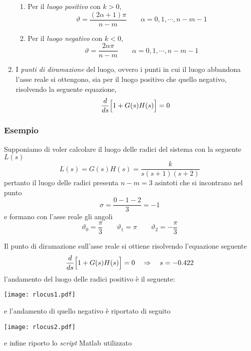 \begin{enumerate}
	\begin{enumerate}
		\item Per il \emph{luogo positivo} con $k>0$,
			\begin{equation}
				\vartheta = \frac{(2\alpha + 1) \pi}{n-m} \qquad \alpha = 0,1,\cdots,n-m-1
			\end{equation}
		\item Per il \emph{luogo negativo} con $k<0$,
			\begin{equation}
				\vartheta = \frac{2\alpha \pi}{n-m} \qquad \alpha = 0,1,\cdots,n-m-1
			\end{equation}
	\end{enumerate}
	\item I \emph{punti di diramazione} del luogo, ovvero i punti in cui il luogo abbandona l'asse reale si ottengono, sia per il luogo positivo che quello negativo, risolvendo la seguente equazione,
		\begin{equation}
			\frac{d}{ds} \Bigl[ 1 + G(s)H(s) \Bigr] = 0
		\end{equation}
\end{enumerate}

\subsubsection{Esempio}
Supponiamo di voler calcolare il luogo delle radici del sistema con la seguente $L(s)$
\begin{equation}
	L(s) = G(s)H(s) = \frac{k}{s(s+1)(s+2)} 
\end{equation}
pertanto il luogo delle radici presenta $n-m = 3$ asintoti che si incontrano nel punto
\begin{equation}
	\sigma = \frac{0-1-2}{3} = -1
\end{equation}
e formano con l'asse reale gli angoli
\begin{equation}
	\vartheta_0 = \frac{\pi}{3} \qquad \vartheta_1 = \pi \qquad \vartheta_2 = -\frac{\pi}{3} 
\end{equation}

Il punto di diramazione sull'asse reale si ottiene risolvendo l'equazione seguente
\begin{equation}
	\frac{d}{ds} \Bigl[ 1 + G(s)H(s) \Bigr] = 0 \quad \Rightarrow \quad s = -0.422
\end{equation}
l'andamento del luogo delle radici positivo è il seguente:
\begin{center}
	\texttt{[image: rlocus1.pdf]}
\end{center}
e l'andamento di quello negativo è riportato di seguito
\begin{center}
	\texttt{[image: rlocus2.pdf]}
\end{center}
e infine riporto lo \emph{script} Matlab utilizzato 


